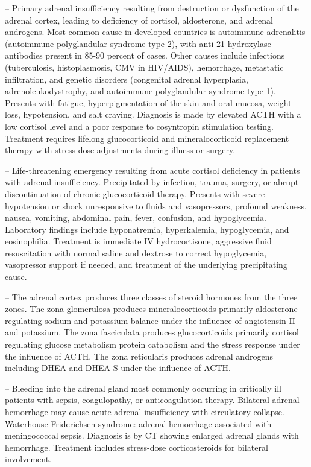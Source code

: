 -- Primary adrenal insufficiency resulting from destruction or dysfunction of the adrenal cortex, leading to deficiency of cortisol, aldosterone, and adrenal androgens. Most common cause in developed countries is autoimmune adrenalitis (autoimmune polyglandular syndrome type 2), with anti-21-hydroxylase antibodies present in 85-90 percent of cases. Other causes include infections (tuberculosis, histoplasmosis, CMV in HIV/AIDS), hemorrhage, metastatic infiltration, and genetic disorders (congenital adrenal hyperplasia, adrenoleukodystrophy, and autoimmune polyglandular syndrome type 1). Presents with fatigue, hyperpigmentation of the skin and oral mucosa, weight loss, hypotension, and salt craving. Diagnosis is made by elevated ACTH with a low cortisol level and a poor response to cosyntropin stimulation testing. Treatment requires lifelong glucocorticoid and mineralocorticoid replacement therapy with stress dose adjustments during illness or surgery.

-- Life-threatening emergency resulting from acute cortisol deficiency in patients with adrenal insufficiency. Precipitated by infection, trauma, surgery, or abrupt discontinuation of chronic glucocorticoid therapy. Presents with severe hypotension or shock unresponsive to fluids and vasopressors, profound weakness, nausea, vomiting, abdominal pain, fever, confusion, and hypoglycemia. Laboratory findings include hyponatremia, hyperkalemia, hypoglycemia, and eosinophilia. Treatment is immediate IV hydrocortisone, aggressive fluid resuscitation with normal saline and dextrose to correct hypoglycemia, vasopressor support if needed, and treatment of the underlying precipitating cause.

-- The adrenal cortex produces three classes of steroid hormones from the three zones. The zona glomerulosa produces mineralocorticoids primarily aldosterone regulating sodium and potassium balance under the influence of angiotensin II and potassium. The zona fasciculata produces glucocorticoids primarily cortisol regulating glucose metabolism protein catabolism and the stress response under the influence of ACTH. The zona reticularis produces adrenal androgens including DHEA and DHEA-S under the influence of ACTH.

-- Bleeding into the adrenal gland most commonly occurring in critically ill patients with sepsis, coagulopathy, or anticoagulation therapy. Bilateral adrenal hemorrhage may cause acute adrenal insufficiency with circulatory collapse. Waterhouse-Friderichsen syndrome: adrenal hemorrhage associated with meningococcal sepsis. Diagnosis is by CT showing enlarged adrenal glands with hemorrhage. Treatment includes stress-dose corticosteroids for bilateral involvement.

